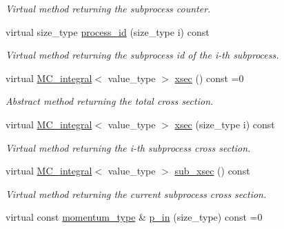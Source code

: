 \begin{DoxyCompactItemize}
\begin{DoxyCompactList}\small\item\em Virtual method returning the subprocess counter. \end{DoxyCompactList}\item 
\hypertarget{a00451_a5930bc44696691ed869bb5ac7173dd1f}{}virtual size\+\_\+type \hyperlink{a00451_a5930bc44696691ed869bb5ac7173dd1f}{process\+\_\+id} (size\+\_\+type i) const \label{a00451_a5930bc44696691ed869bb5ac7173dd1f}

\begin{DoxyCompactList}\small\item\em Virtual method returning the subprocess id of the i-\/th subprocess. \end{DoxyCompactList}\item 
\hypertarget{a00451_ac566cf6311f00e3988f99148b42eda90}{}virtual \hyperlink{a00368}{M\+C\+\_\+integral}$<$ value\+\_\+type $>$ \hyperlink{a00451_ac566cf6311f00e3988f99148b42eda90}{xsec} () const =0\label{a00451_ac566cf6311f00e3988f99148b42eda90}

\begin{DoxyCompactList}\small\item\em Abstract method returning the total cross section. \end{DoxyCompactList}\item 
\hypertarget{a00451_a2e629cc4c877cf4208da9c904aa1efd9}{}virtual \hyperlink{a00368}{M\+C\+\_\+integral}$<$ value\+\_\+type $>$ \hyperlink{a00451_a2e629cc4c877cf4208da9c904aa1efd9}{xsec} (size\+\_\+type i) const \label{a00451_a2e629cc4c877cf4208da9c904aa1efd9}

\begin{DoxyCompactList}\small\item\em Virtual method returning the i-\/th subprocess cross section. \end{DoxyCompactList}\item 
\hypertarget{a00451_ae971360f5465b09ca100b995722a7f48}{}virtual \hyperlink{a00368}{M\+C\+\_\+integral}$<$ value\+\_\+type $>$ \hyperlink{a00451_ae971360f5465b09ca100b995722a7f48}{sub\+\_\+xsec} () const \label{a00451_ae971360f5465b09ca100b995722a7f48}

\begin{DoxyCompactList}\small\item\em Virtual method returning the current subprocess cross section. \end{DoxyCompactList}\item 
\hypertarget{a00451_aa114103671c3305f3728e10b8623a7ea}{}virtual const \hyperlink{a00579}{momentum\+\_\+type} \& \hyperlink{a00451_aa114103671c3305f3728e10b8623a7ea}{p\+\_\+in} (size\+\_\+type) const =0\label{a00451_aa114103671c3305f3728e10b8623a7ea}


\end{DoxyCompactItemize}
